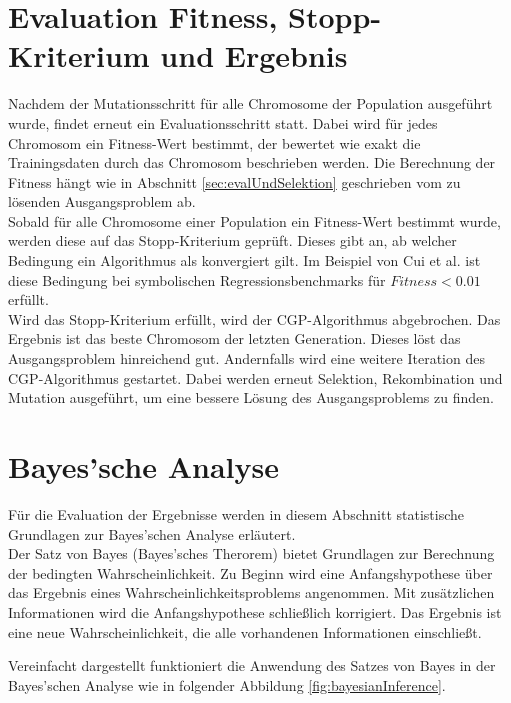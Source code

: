 \section{Evaluation Fitness, Stopp-Kriterium und Ergebnis}
\label{sec:fitness,StopKrit,Ergebnis}

Nachdem der Mutationsschritt für alle Chromosome der Population ausgeführt wurde, findet erneut ein Evaluationsschritt statt.
Dabei wird für jedes Chromosom ein Fitness-Wert bestimmt, der bewertet wie exakt die Trainingsdaten durch das Chromosom beschrieben werden. \cite{milad_taleby_ahvanooey_survey_2019}
Die Berechnung der Fitness hängt wie in Abschnitt \ref{sec:evalUndSelektion} geschrieben vom zu lösenden Ausgangsproblem ab.\\
Sobald für alle Chromosome einer Population ein Fitness-Wert bestimmt wurde, werden diese auf das Stopp-Kriterium geprüft.
Dieses gibt an, ab welcher Bedingung ein Algorithmus als konvergiert gilt.
Im Beispiel von Cui et al. ist diese Bedingung bei symbolischen Regressionsbenchmarks für $Fitness < 0.01$ erfüllt. \cite{affenzeller_positional_2024}\\
Wird das Stopp-Kriterium erfüllt, wird der CGP-Algorithmus abgebrochen.
Das Ergebnis ist das beste Chromosom der letzten Generation.
Dieses löst das Ausgangsproblem hinreichend gut.
Andernfalls wird eine weitere Iteration des CGP-Algorithmus gestartet. 
Dabei werden erneut Selektion, Rekombination und Mutation ausgeführt, um eine bessere Lösung des Ausgangsproblems zu finden.

\section{Bayes'sche Analyse}
\label{sec:bayesian}

Für die Evaluation der Ergebnisse werden in diesem Abschnitt statistische Grundlagen zur Bayes'schen Analyse erläutert.\\
Der Satz von Bayes (Bayes'sches Therorem) bietet Grundlagen zur Berechnung der bedingten Wahrscheinlichkeit.
Zu Beginn wird eine Anfangshypothese über das Ergebnis eines Wahrscheinlichkeitsproblems angenommen.
Mit zusätzlichen Informationen wird die Anfangshypothese schließlich korrigiert.
Das Ergebnis ist eine neue Wahrscheinlichkeit, die alle vorhandenen Informationen einschließt. \cite{peyrolon_definition_2020}

Vereinfacht dargestellt funktioniert die Anwendung des Satzes von Bayes in der Bayes'schen Analyse wie in folgender Abbildung \ref{fig:bayesianInference}.

